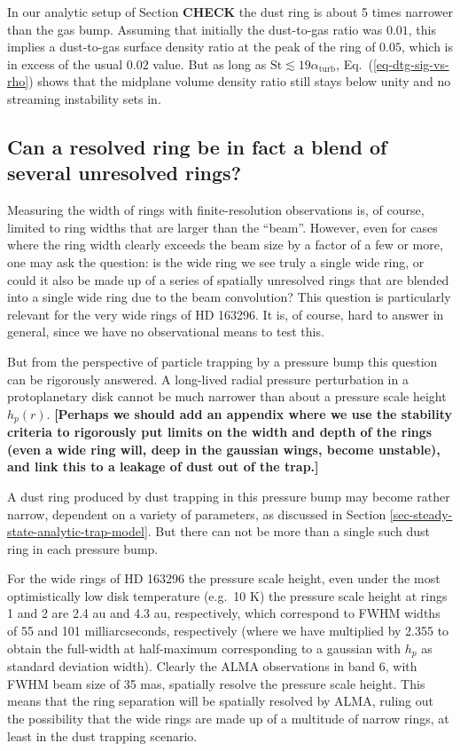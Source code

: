 \documentclass{aa}
\begin{document}
In our analytic setup of Section {\bf CHECK} %
the dust ring is about 5 times narrower than the gas bump. Assuming that
initially the dust-to-gas ratio was $0.01$, this implies a dust-to-gas surface
density ratio at the peak of the ring of $0.05$, which is in excess of the usual
$0.02$ value. But as long as $\mathrm{St}\lesssim 19\alpha_{\mathrm{turb}}$,
Eq.~(\ref{eq-dtg-sig-vs-rho}) shows that the midplane volume density ratio still
stays below unity and no streaming instability sets in.



\subsection{Can a resolved ring be in fact a blend of several unresolved rings?}
Measuring the width of rings with finite-resolution observations is, of course,
limited to ring widths that are larger than the ``beam''. However, even for
cases where the ring width clearly exceeds the beam size by a factor of a few or
more, one may ask the question: is the wide ring we see truly a single wide
ring, or could it also be made up of a series of spatially unresolved rings that
are blended into a single wide ring due to the beam convolution? This question
is particularly relevant for the very wide rings of HD 163296. It is, of course,
hard to answer in general, since we have no observational means to test this.

But from the perspective of particle trapping by a pressure bump this question
can be rigorously answered. A long-lived radial pressure perturbation in a
protoplanetary disk cannot be much narrower than about a pressure scale height
$h_p(r)$. {\bf [Perhaps we should add an appendix where we use the stability
    criteria to rigorously put limits on the width and depth of the rings (even
    a wide ring will, deep in the gaussian wings, become unstable), and
    link this to a leakage of dust out of the trap.]}

A dust ring produced by dust trapping in this pressure bump may become
rather narrow, dependent on a variety of parameters, as discussed in
Section \ref{sec-steady-state-analytic-trap-model}. But there can not be
more than a single such dust ring in each pressure bump.

For the wide rings of HD 163296 the pressure scale height, even under the most
optimistically low disk temperature (e.g.~10 K) the pressure scale height at
rings 1 and 2 are 2.4 au and 4.3 au, respectively, which correspond to FWHM
widths of 55 and 101 milliarcseconds, respectively (where we have multiplied by
2.355 to obtain the full-width at half-maximum corresponding to a gaussian with
$h_p$ as standard deviation width). Clearly the ALMA observations in band 6,
with FWHM beam size of 35 mas, spatially resolve the pressure scale height.
This means that the ring separation will be spatially resolved by ALMA,
ruling out the possibility that the wide rings are made up of a multitude of
narrow rings, at least in the dust trapping scenario.
\end{document}
